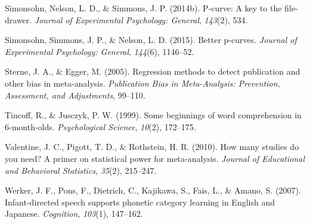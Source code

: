 \documentclass[english,floatsintext,man]{apa6}
\theoremstyle{definition}
\theoremstyle{definition}
\theoremstyle{remark}
\begin{document}
\hypertarget{ref-simonsohn2014p}{}
Simonsohn, Nelson, L. D., \& Simmons, J. P. (2014b). P-curve: A key to
the file-drawer. \emph{Journal of Experimental Psychology: General},
\emph{143}(2), 534.

\hypertarget{ref-simonsohn2015better}{}
Simonsohn, Simmons, J. P., \& Nelson, L. D. (2015). Better p-curves.
\emph{Journal of Experimental Psychology: General}, \emph{144}(6),
1146--52.

\hypertarget{ref-sterne2005regression}{}
Sterne, J. A., \& Egger, M. (2005). Regression methods to detect
publication and other bias in meta-analysis. \emph{Publication Bias in
Meta-Analysis: Prevention, Assessment, and Adjustments}, 99--110.

\hypertarget{ref-tincoff1999some}{}
Tincoff, R., \& Jusczyk, P. W. (1999). Some beginnings of word
comprehension in 6-month-olds. \emph{Psychological Science},
\emph{10}(2), 172--175.

\hypertarget{ref-valentine2010many}{}
Valentine, J. C., Pigott, T. D., \& Rothstein, H. R. (2010). How many
studies do you need? A primer on statistical power for meta-analysis.
\emph{Journal of Educational and Behavioral Statistics}, \emph{35}(2),
215--247.

\hypertarget{ref-werker2007infant}{}
Werker, J. F., Pons, F., Dietrich, C., Kajikawa, S., Fais, L., \& Amano,
S. (2007). Infant-directed speech supports phonetic category learning in
English and Japanese. \emph{Cognition}, \emph{103}(1), 147--162.
\end{document}
